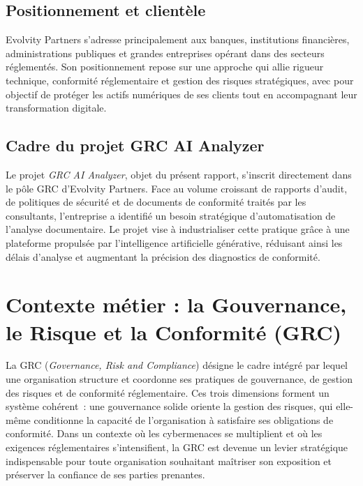 \documentclass[a4paper,12pt,oneside]{report}
\begin{document}
	\subsection{Positionnement et client\`ele}
	
	Evolvity Partners s'adresse principalement aux banques, institutions financi\`eres, administrations publiques et grandes entreprises op\'erant dans des secteurs r\'eglement\'es. Son positionnement repose sur une approche qui allie rigueur technique, conformit\'e r\'eglementaire et gestion des risques strat\'egiques, avec pour objectif de prot\'eger les actifs num\'eriques de ses clients tout en accompagnant leur transformation digitale.
	
	\subsection{Cadre du projet GRC AI Analyzer}
	
	Le projet \textit{GRC AI Analyzer}, objet du pr\'esent rapport, s'inscrit directement dans le p\^ole GRC d'Evolvity Partners. Face au volume croissant de rapports d'audit, de politiques de s\'ecurit\'e et de documents de conformit\'e trait\'es par les consultants, l'entreprise a identifi\'e un besoin strat\'egique d'automatisation de l'analyse documentaire. Le projet vise \`a industrialiser cette pratique gr\^ace \`a une plateforme propuls\'ee par l'intelligence artificielle g\'en\'erative, r\'eduisant ainsi les d\'elais d'analyse et augmentant la pr\'ecision des diagnostics de conformit\'e.
	
	\section{Contexte m\'etier : la Gouvernance, le Risque et la Conformit\'e (GRC)}
	
	La GRC (\textit{Governance, Risk and Compliance}) d\'esigne le cadre int\'egr\'e par lequel une organisation structure et coordonne ses pratiques de gouvernance, de gestion des risques et de conformit\'e r\'eglementaire. Ces trois dimensions forment un syst\`eme coh\'erent~: une gouvernance solide oriente la gestion des risques, qui elle-m\^eme conditionne la capacit\'e de l'organisation \`a satisfaire ses obligations de conformit\'e. Dans un contexte o\`u les cybermenaces se multiplient et o\`u les exigences r\'eglementaires s'intensifient, la GRC est devenue un levier strat\'egique indispensable pour toute organisation souhaitant ma\^itriser son exposition et pr\'eserver la confiance de ses parties prenantes.
	
\end{document}

